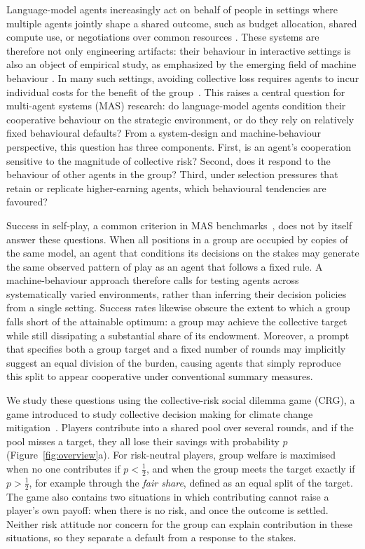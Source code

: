 \documentclass[sigconf,anonymous]{aamas}
\begin{document}
Language-model agents increasingly act on behalf of people in settings where multiple agents jointly shape a shared outcome, such as budget allocation, shared compute use, or negotiations over common resources \cite{chan2024visibility,hammond2025multi}. These systems are therefore not only engineering artifacts: their behaviour in interactive settings is also an object of empirical study, as emphasized by the emerging field of machine behaviour \cite{rahwan2019machine}. In many such settings, avoiding collective loss requires agents to incur individual costs for the benefit of the group~\cite{santos2011risk,santos2019outcome,milinski2008collective}. This raises a central question for multi-agent systems (MAS) research: do language-model agents condition their cooperative behaviour on the strategic environment, or do they rely on relatively fixed behavioural defaults? From a system-design and machine-behaviour perspective, this question has three components. First, is an agent’s cooperation sensitive to the magnitude of collective risk? Second, does it respond to the behaviour of other agents in the group? Third, under selection pressures that retain or replicate higher-earning agents, which behavioural tendencies are favoured?

Success in self-play, a common criterion in MAS benchmarks~\cite{piatti2024cooperate,huang2025competing}, does not by itself answer these questions. When all positions in a group are occupied by copies of the same model, an agent that conditions its decisions on the stakes may generate the same observed pattern of play as an agent that follows a fixed rule. A machine-behaviour approach therefore calls for testing agents across systematically varied environments, rather than inferring their decision policies from a single setting. Success rates likewise obscure the extent to which a group falls short of the attainable optimum: a group may achieve the collective target while still dissipating a substantial share of its endowment. Moreover, a prompt that specifies both a group target and a fixed number of rounds may implicitly suggest an equal division of the burden, causing agents that simply reproduce this split to appear cooperative under conventional summary measures.

We study these questions using the collective-risk social dilemma game (CRG), a game introduced to study collective decision making for climate change mitigation~\cite{milinski2008collective}. Players contribute into a shared pool over several rounds, and if the pool misses a target, they all lose their savings with probability $p$ (Figure~\ref{fig:overview}a). For risk-neutral players, group welfare is maximised when no one contributes if $p < \tfrac{1}{2}$, and when the group meets the target exactly if $p > \tfrac{1}{2}$, for example through the \emph{fair share}, defined as an equal split of the target. The game also contains two situations in which contributing  cannot raise a player's own payoff: when there is no risk, and once the outcome is settled. Neither risk attitude nor concern for the group can explain  contribution in these situations, so they separate a default from a response to the stakes.
\end{document}
